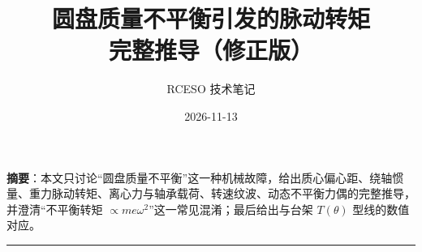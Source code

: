 \documentclass[11pt,a4paper]{ctexart}
\title{圆盘质量不平衡引发的脉动转矩\\[2pt]\large 完整推导（修正版）}
\author{RCESO 技术笔记}
\date{2026-11-13}
\begin{document}
\maketitle
\noindent\textbf{摘要}：本文只讨论“圆盘质量不平衡”这一种机械故障，给出质心偏心距、绕轴惯量、重力脉动转矩、离心力与轴承载荷、转速纹波、动态不平衡力偶的完整推导，并澄清“不平衡转矩 $\propto m e\omega^2$”这一常见混淆；最后给出与台架 $T(\theta)$ 型线的数值对应。
\vspace{4pt}\hrule\vspace{6pt}


\end{document}

